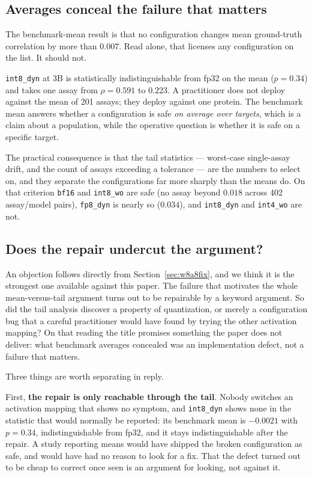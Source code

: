 \documentclass[11pt]{article}
\newcommand{\cfg}[1]{\texttt{#1}}
\begin{document}
\subsection{Averages conceal the failure that matters}

The benchmark-mean result is that no configuration changes mean ground-truth
correlation by more than $0.007$. Read alone, that licenses any configuration on
the list. It should not.

\cfg{int8\_dyn} at 3B is statistically indistinguishable from fp32 on the mean
($p = 0.34$) and takes one assay from $\rho = 0.591$ to $0.223$. A practitioner
does not deploy against the mean of 201 assays; they deploy against one protein.
The benchmark mean answers whether a configuration is safe \emph{on average over
targets}, which is a claim about a population, while the operative question is
whether it is safe on a specific target.

The practical consequence is that the tail statistics --- worst-case single-assay
drift, and the count of assays exceeding a tolerance --- are the numbers to
select on, and they separate the configurations far more sharply than the means
do. On that criterion \cfg{bf16} and \cfg{int8\_wo} are safe (no assay beyond
$0.018$ across 402 assay/model pairs), \cfg{fp8\_dyn} is nearly so ($0.034$), and
\cfg{int8\_dyn} and \cfg{int4\_wo} are not.

\subsection{Does the repair undercut the argument?}

An objection follows directly from Section~\ref{sec:w8a8fix}, and we think it is
the strongest one available against this paper. The failure that motivates the
whole mean-versus-tail argument turns out to be repairable by a keyword
argument. So did the tail analysis discover a property of quantization, or
merely a configuration bug that a careful practitioner would have found by
trying the other activation mapping? On that reading the title promises
something the paper does not deliver: what benchmark averages concealed was an
implementation defect, not a failure that matters.

Three things are worth separating in reply.

First, \textbf{the repair is only reachable through the tail}. Nobody switches
an activation mapping that shows no symptom, and \cfg{int8\_dyn} shows none in
the statistic that would normally be reported: its benchmark mean is
$-0.0021$ with $p = 0.34$, indistinguishable from fp32, and it stays
indistinguishable after the repair. A study reporting means would have shipped
the broken configuration as safe, and would have had no reason to look for a
fix. That the defect turned out to be cheap to correct once seen is an argument
for looking, not against it.
\end{document}
